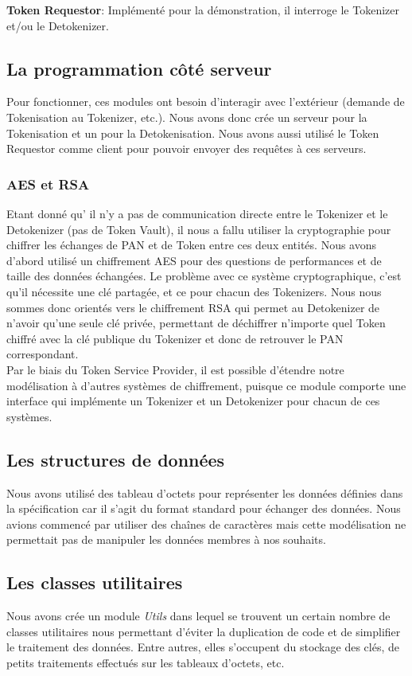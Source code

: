 \documentclass{report}
\begin{document}
\noindent
\textbf{Token Requestor}: Implémenté pour la démonstration, il interroge le Tokenizer et/ou le Detokenizer.

\subsection{La programmation côté serveur}
Pour fonctionner, ces modules ont besoin d'interagir avec l'extérieur (demande de Tokenisation au Tokenizer, etc.). Nous avons donc crée un serveur pour la Tokenisation et un pour la Detokenisation. Nous avons aussi utilisé le Token Requestor comme client pour pouvoir envoyer des requêtes à ces serveurs.

\subsubsection{AES et RSA}
Etant donné qu' il n'y a pas de communication directe entre le Tokenizer et le Detokenizer (pas de Token Vault), il nous a fallu utiliser la cryptographie pour chiffrer les échanges de PAN et de Token entre ces deux entités. Nous avons d'abord utilisé un chiffrement AES pour des questions de performances et de taille des données échangées. Le problème avec ce système cryptographique, c'est qu'il nécessite une clé partagée, et ce pour chacun des Tokenizers. Nous nous sommes donc orientés vers le chiffrement RSA qui permet au Detokenizer de n'avoir qu'une seule clé privée, permettant de déchiffrer n'importe quel Token chiffré avec la clé publique du Tokenizer et donc de retrouver le PAN correspondant.\\
Par le biais du Token Service Provider, il est possible d'étendre notre modélisation à d'autres systèmes de chiffrement, puisque ce module comporte une interface qui implémente un Tokenizer et un Detokenizer pour chacun de ces systèmes.

\subsection{Les structures de données}
Nous avons utilisé des tableau d'octets pour représenter les données définies dans la spécification car il s'agit du format standard pour échanger des données. Nous avions commencé par utiliser des chaînes de caractères mais cette modélisation ne permettait pas de manipuler les données membres à nos souhaits.

\subsection{Les classes utilitaires}
Nous avons crée un module \textit{Utils} dans lequel se trouvent un certain nombre de classes utilitaires nous permettant d'éviter la duplication de code et de simplifier le traitement des données. Entre autres, elles s'occupent du stockage des clés, de petits traitements effectués sur les tableaux d'octets, etc.
\end{document}
